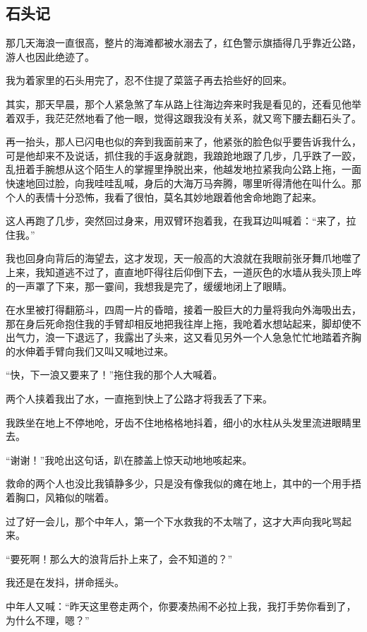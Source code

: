 \subsection{石头记}

\par 那几天海浪一直很高，整片的海滩都被水溺去了，红色警示旗插得几乎靠近公路，游人也因此绝迹了。
\par 我为着家里的石头用完了，忍不住提了菜篮子再去拾些好的回来。
\par 其实，那天早晨，那个人紧急煞了车从路上往海边奔来时我是看见的，还看见他举着双手，我茫茫然地看了他一眼，觉得这跟我没有关系，就又弯下腰去翻石头了。
\par 再一抬头，那人已闪电也似的奔到我面前来了，他紧张的脸色似乎要告诉我什么，可是他却来不及说话，抓住我的手返身就跑，我踉跄地跟了几步，几乎跌了一跤，乱扭着手腕想从这个陌生人的掌握里挣脱出来，他越发地拉紧我向公路上拖，一面快速地回过脸，向我哇哇乱喊，身后的大海万马奔腾，哪里听得清他在叫什么。那个人的表情十分恐怖，我看了很怕，莫名其妙地跟着他舍命地跑了起来。
\par 这人再跑了几步，突然回过身来，用双臂环抱着我，在我耳边叫喊着：“来了，拉住我。”
\par 我也回身向背后的海望去，这才发现，天一般高的大浪就在我眼前张牙舞爪地噬了上来，我知道逃不过了，直直地吓得往后仰倒下去，一道灰色的水墙从我头顶上哗的一声罩了下来，那一霎间，我想我是完了，缓缓地闭上了眼睛。
\par 在水里被打得翻筋斗，四周一片的昏暗，接着一股巨大的力量将我向外海吸出去，那在身后死命抱住我的手臂却相反地把我往岸上拖，我呛着水想站起来，脚却使不出气力，浪一下退远了，我露出了头来，这又看见另外一个人急急忙忙地踏着齐胸的水伸着手臂向我们又叫又喊地过来。
\par “快，下一浪又要来了！”拖住我的那个人大喊着。
\par 两个人挟着我出了水，一直拖到快上了公路才将我丢了下来。
\par 我跌坐在地上不停地呛，牙齿不住地格格地抖着，细小的水柱从头发里流进眼睛里去。
\par “谢谢！”我呛出这句话，趴在膝盖上惊天动地地咳起来。
\par 救命的两个人也没比我镇静多少，只是没有像我似的瘫在地上，其中的一个用手捂着胸口，风箱似的喘着。
\par 过了好一会儿，那个中年人，第一个下水救我的不太喘了，这才大声向我叱骂起来。
\par “要死啊！那么大的浪背后扑上来了，会不知道的？”
\par 我还是在发抖，拼命摇头。
\par 中年人又喊：“昨天这里卷走两个，你要凑热闹不必拉上我，我打手势你看到了，为什么不理，嗯？”
